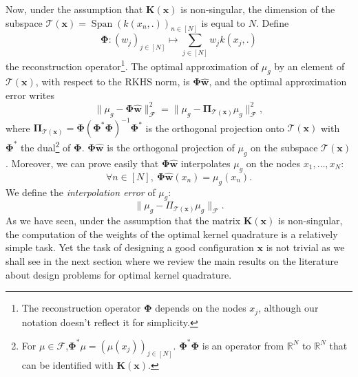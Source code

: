 \documentclass[twoside,11pt]{book}
\numberwithin{theorem}{chapter}
\numberwithin{definition}{chapter}
\numberwithin{proposition}{chapter}
\numberwithin{corollary}{chapter}
\numberwithin{example}{chapter}
\numberwithin{lemma}{chapter}
\numberwithin{assumption}{chapter}
\DeclareMathOperator{\Span}{\mathrm{Span}}
\begin{document}
Now, under the assumption that $\bm{K}(\bm{x})$ is non-singular, the dimension of the subspace $\mathcal{T}(\bm{x}) = \Span (k(x_{n},.))_{n \in [N]}$ is equal to $N$. Define 
\begin{equation}
	\bm{\Phi}:(w_{j})_{j \in [N]} \mapsto \sum_{j \in [N]} w_{j} k(x_{j},.)
\end{equation}
 the reconstruction operator\footnote{The reconstruction operator $\bm{\Phi}$ depends on the nodes $x_{j}$, although our notation doesn't reflect it for simplicity.}. The optimal approximation of $\mu_{g}$ by an element of $\mathcal{T}(\bm{x})$, with respect to the RKHS norm, is $\bm{\Phi}\hat{\bm{w}}$, and the optimal approximation error writes
\begin{equation}
\|\mu_{g} - \bm{\Phi}\hat{\bm{w}}\|^{2}_{\mathcal{F}} =\|\mu_{g} - \bm{\Pi}_{\mathcal{T}(\bm{x})}\mu_{g}\|^{2}_{\mathcal{F}},\label{e:finalTool}
\end{equation}
where $\bm{\Pi}_{\mathcal{T}(\bm{x})} = \bm{\Phi}(\bm{\Phi}^{*}\bm{\Phi})^{-1}\bm{\Phi}^{*}$ is the orthogonal projection onto $\mathcal{T}(\bm{x})$ with $\bm{\Phi}^{*}$ the dual\footnote{For $\mu \in \mathcal{F}$,$\bm{\Phi}^{*}\mu = (\mu(x_{j}))_{j \in [N]}$. $\bm{\Phi}^{*}\bm{\Phi}$ is an operator from $\mathbb{R}^{N}$ to $\mathbb{R}^{N}$ that can be identified with $\bm{K}(\bm{x})$.} of $\bm{\Phi}$. $\bm{\Phi}\hat{\bm{w}}$ is the orthogonal projection of $\mu_{g}$ on the subspace $\mathcal{T}(\bm{x})$. Moreover, we can prove easily that $\bm{\Phi}\hat{\bm{w}}$ interpolates $\mu_{g}$ on the nodes $x_{1}, \dots, x_{N}$:
\begin{equation}
\forall n \in [N], \:\bm{\Phi}\hat{\bm{w}}(x_{n}) = \mu_{g}(x_{n}).
\end{equation}
We define the \emph{interpolation error} of $\mu_{g}$:
\begin{equation}
\|\mu_{g}- \Pi_{\mathcal{T}(\bm{x})}\mu_{g}\|_{\mathcal{F}}.
\end{equation}
As we have seen, under the assumption that the matrix $\bm{K}(\bm{x})$ is non-singular, the computation of the weights of the optimal kernel quadrature is a relatively simple task. Yet the task of designing a good configuration $\bm{x}$ is not trivial as we shall see in the next section where we review the main results on the literature about design problems for optimal kernel quadrature.
\end{document}
